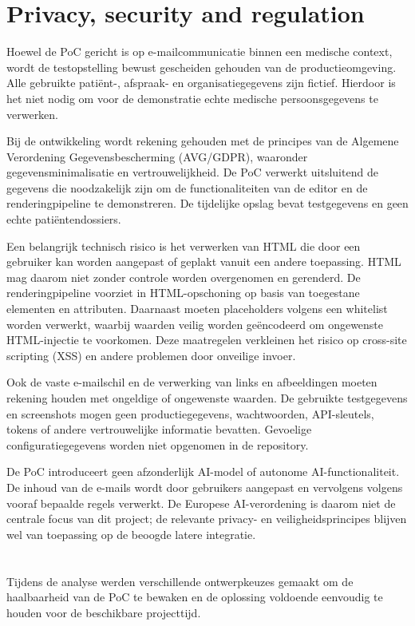\section{
{Privacy, security and regulation}}%
\label{sec:privacy}
Hoewel de PoC gericht is op e-mailcommunicatie binnen een medische context,
wordt de testopstelling bewust gescheiden gehouden van de productieomgeving.
Alle gebruikte patiënt-, afspraak- en organisatiegegevens zijn fictief.
Hierdoor is het niet nodig om voor de demonstratie echte medische
persoonsgegevens te verwerken.

Bij de ontwikkeling wordt rekening gehouden met de principes van de
Algemene Verordening Gegevensbescherming (AVG/GDPR), waaronder
gegevensminimalisatie en vertrouwelijkheid. De PoC verwerkt uitsluitend
de gegevens die noodzakelijk zijn om de functionaliteiten van de editor
en de renderingpipeline te demonstreren. De tijdelijke opslag bevat
testgegevens en geen echte patiëntendossiers.

Een belangrijk technisch risico is het verwerken van HTML die door een
gebruiker kan worden aangepast of geplakt vanuit een andere toepassing.
HTML mag daarom niet zonder controle worden overgenomen en gerenderd.
De renderingpipeline voorziet in HTML-opschoning op basis van toegestane
elementen en attributen. Daarnaast moeten placeholders volgens een
whitelist worden verwerkt, waarbij waarden veilig worden geëncodeerd
om ongewenste HTML-injectie te voorkomen. Deze maatregelen verkleinen
het risico op cross-site scripting (XSS) en andere problemen door
onveilige invoer.

Ook de vaste e-mailschil en de verwerking van links en afbeeldingen moeten
rekening houden met ongeldige of ongewenste waarden. De gebruikte
testgegevens en screenshots mogen geen productiegegevens, wachtwoorden,
API-sleutels, tokens of andere vertrouwelijke informatie bevatten.
Gevoelige configuratiegegevens worden niet opgenomen in de repository.

De PoC introduceert geen afzonderlijk AI-model of autonome AI-functionaliteit.
De inhoud van de e-mails wordt door gebruikers aangepast en vervolgens
volgens vooraf bepaalde regels verwerkt. De Europese AI-verordening is
daarom niet de centrale focus van dit project; de relevante privacy- en
veiligheidsprincipes blijven wel van toepassing op de beoogde latere
integratie.

\section{}%
\label{sec:ontwerpkeuzes}
Tijdens de analyse werden verschillende ontwerpkeuzes gemaakt om de
haalbaarheid van de PoC te bewaken en de oplossing voldoende eenvoudig
te houden voor de beschikbare projecttijd.

